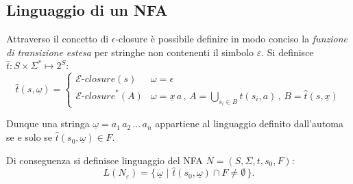 \subsection{Linguaggio di un NFA}
Attraverso il concetto di $\epsilon$-closure è possibile definire in modo conciso la \emph{funzione di transizione estesa} per stringhe non contenenti il simbolo $\varepsilon$. 
Si definisce $\hat t:  S \times \Sigma^* \mapsto 2^S$:
$$
\hat t(s, \underline \omega) = \begin{cases}
\mathcal{E}\textit{-closure}(s) & \omega = \epsilon \\
\mathcal{E}\textit{-closure}^*(A) & \omega = \underline x \, a \,,\, A=\displaystyle\bigcup_{s_i \in B} t(s_i, a)\,,\,B=\hat t(s, \underline x)
\end{cases}
$$

Dunque una stringa $\underline \omega = a_1\, a_2\,\dots\,a_n$ appartiene al linguaggio definito dall'automa se e solo se $\hat t(s_0, \underline \omega) \in F$.

Di conseguenza si definisce linguaggio del NFA $N = (S,\Sigma, t, s_0, F)$:
$$
L(N_\varepsilon) = \{\,\underline \omega\,\,|\,\,\hat t(s_0, \underline \omega) \cap F \ne \emptyset\,\}.
$$


\newpage
